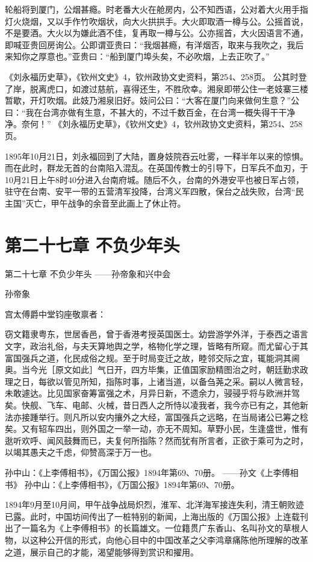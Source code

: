 \documentclass[12pt,UTF8]{ctexbook}
\begin{document}
轮船将到厦门，公烟甚瘾。时老番大火在舱房内，公不知西语，公对着大火用手指灯火烧烟，又以手作竹吹烟状，向大火拱拱手。大火即取酒一樽与公。公摇首说，不是要酒。大火以为嫌此酒不佳，复再取一樽与公。公亦摇首，大火因语言不通，即喊亚贵回房询公。公即谓亚贵曰：“我烟甚瘾，有洋烟否，取来与我吹之，我后来知你之厚意也。”亚贵曰：“船到厦门埠头矣，不必吹烟，上去正吹了。”

《刘永福历史草》，《钦州文史》4，钦州政协文史资料，第254、258页。
公其时登了岸，脱离虎口，如渡过慈航，喜得还生，不胜欣幸。湘泉即带公住一老妓寨三楼暂歇，开灯吹烟。此妓乃湘泉旧好。妓问公曰：“大客在厦门向来做何生意？”公曰：“我在台湾亦做有生意，不甚大的，不过千数百金，在台湾一概失得干干净净。奈何！” 《刘永福历史草》，《钦州文史》4，钦州政协文史资料，第254、258页。

1895年10月21日，刘永福回到了大陆，置身妓院吞云吐雾，一释半年以来的惊惧。而在此时，群龙无首的台南陷入混乱。在英国传教士的引导下，日军兵不血刃，于10月21日上午8时40分进入台南府城。随后不久，台南的外港安平也被日军占领，驻守在台南、安平一带的五营清军投降，台湾义军四散，保台之战失败，台湾“民主国”灭亡，甲午战争的余音至此画上了休止符。

\chapter{第二十七章 不负少年头}
第二十七章
不负少年头
——孙帝象和兴中会

孙帝象

宫太傅爵中堂钧座敬禀者：

窃文籍隶粤东，世居香邑，曾于香港考授英国医士。幼尝游学外洋，于泰西之语言文字，政治礼俗，与夫天算地舆之学，格物化学之理，皆略有所窥。而尤留心于其富国强兵之道，化民成俗之规。至于时局变迁之故，睦邻交际之宜，辄能洞其阃奥。当今光［原文如此］气日开，四方毕集，正值国家励精图治之时，朝廷勤求政理之日，每欲以管见所知，指陈时事，上诸当道，以备刍荛之采。嗣以人微言轻，未敢遽达。比见国家奋筹富强之术，月异日新，不遗余力，骎骎乎将与欧洲并驾矣。快舰、飞车、电邮、火械，昔日西人之所恃以凌我者，我今亦已有之，其他新法亦接踵举行。则凡所以安内攘外之大经，富国强兵之远略，在当局诸公已筹之稔矣。又有轺车四出，则外国之一举一动，亦无不周知。草野小民，生逢盛世，惟有逖听欢呼、闻风鼓舞而已，夫复何所指陈？然而犹有所言者，正欲于乘可为之时，以竭其愚夫之千虑，仰赞高深于万一也。

孙中山：《上李傅相书》，《万国公报》1894年第69、70册。
——孙文《上李傅相书》 孙中山：《上李傅相书》，《万国公报》1894年第69、70册。

1894年9月至10月间，甲午战争战局炽烈，淮军、北洋海军接连失利，清王朝败迹已露。此时，中国坊间传出了一桩特别的新闻，上海出版的《万国公报》上连载刊出了一篇名为《上李傅相书》的长篇雄文。一位籍贯广东香山、名叫孙文的草根人物，以这种公开信的形式，向他心目中的中国改革之父李鸿章痛陈他所理解的改革之道，展示自己的才能，渴望能够得到赏识和擢用。
\end{document}
